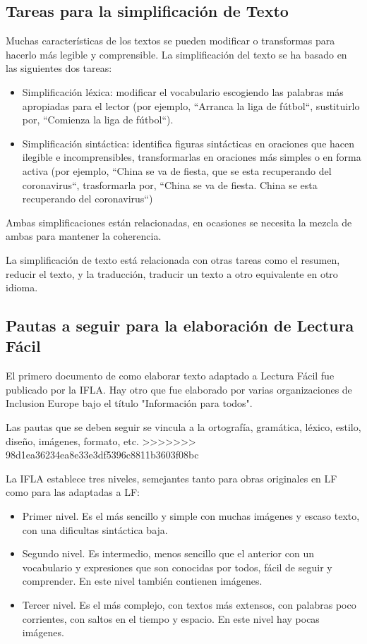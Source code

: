 \subsection{Tareas para la simplificación de Texto}
Muchas características de los textos se pueden modificar o transformas para hacerlo más legible y comprensible.\cite{}
La simplificación del texto se ha basado en las siguientes dos tareas: 
 \begin{itemize}
 	\item Simplificación léxica: modificar el vocabulario escogiendo las palabras más apropiadas para el lector (por ejemplo, ``Arranca la liga de fútbol``, sustituirlo por, ``Comienza la liga de fútbol``).
 	\item Simplificación sintáctica: identifica figuras sintácticas en oraciones que hacen ilegible e incomprensibles, transformarlas en oraciones más simples o en forma activa (por ejemplo, ``China se va de fiesta, que se esta recuperando del coronavirus``, trasformarla por, ``China se va de fiesta. China se esta recuperando del coronavirus``) 
 	\end{itemize}
 Ambas simplificaciones están relacionadas, en ocasiones se necesita la mezcla de ambas para mantener la coherencia.
 
  \setlength{\parskip}{10pt}
  
 La simplificación de texto está relacionada con otras tareas como el resumen, reducir el texto, y la traducción, traducir un texto a otro equivalente en otro idioma. 


\subsection{Pautas a seguir para la elaboración de Lectura Fácil}
 El primero documento de como elaborar texto adaptado a Lectura Fácil fue publicado por la IFLA. Hay otro que fue elaborado por varias organizaciones de Inclusion Europe bajo el título "Información para todos".
 
 Las pautas que se deben seguir se vincula a la ortografía, gramática, léxico, estilo, diseño, imágenes, formato, etc. 
>>>>>>> 98d1ea36234ea8e33e3df5396c8811b3603f08bc
 
La IFLA establece tres niveles, semejantes
tanto para obras originales en LF como para las adaptadas a LF:
\begin{itemize}
	\item Primer nivel. Es el más sencillo y simple con muchas imágenes y escaso texto, con una dificultas sintáctica baja.
\item Segundo nivel. Es intermedio, menos sencillo que el anterior con un vocabulario y expresiones que son conocidas por todos, fácil de seguir y comprender. En este nivel también contienen imágenes.
\item Tercer nivel. Es el más complejo, con textos más extensos, con palabras poco corrientes, con saltos en el tiempo y espacio. En este nivel hay pocas imágenes.
 \end{itemize}

